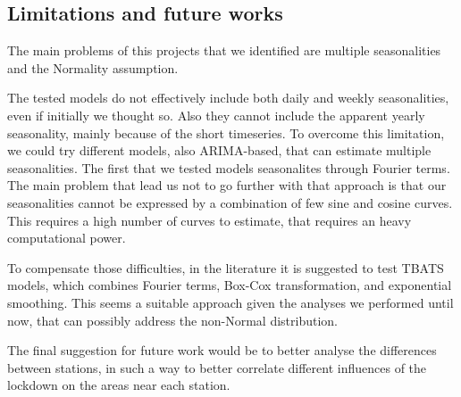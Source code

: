 \documentclass[12pt]{article}
\begin{document}


\subsection{Limitations and future works}
The main problems of this projects that we identified are multiple seasonalities and the Normality assumption.

The tested models do not effectively include both daily and weekly seasonalities, even if initially we thought so. Also they cannot include the apparent yearly seasonality, mainly because of the short timeseries.
To overcome this limitation, we could try different models, also ARIMA-based, that can estimate multiple seasonalities. The first that we tested models seasonalites through Fourier terms. The main problem that lead us not to go further with that approach is that our seasonalities cannot be expressed by a combination of few sine and cosine curves. This requires a high number of curves to estimate, that requires an heavy computational power.

To compensate those difficulties, in the literature it is suggested to test TBATS models, which combines Fourier terms, Box-Cox transformation, and exponential smoothing. This seems a suitable approach given the analyses we performed until now, that can possibly address the non-Normal distribution.

The final suggestion for future work would be to better analyse the differences between stations, in such a way to better correlate different influences of the lockdown on the areas near each station.




\newpage

\end{document}
